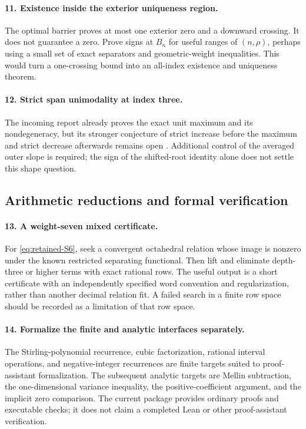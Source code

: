 \paragraph{11. Existence inside the exterior uniqueness region.}
The optimal barrier proves at most one exterior zero and a downward
crossing. It does not guarantee a zero. Prove signs at $B_n$ for useful
ranges of $(n,\rho)$, perhaps using a small set of exact separators
and geometric-weight inequalities. This would turn a one-crossing
bound into an all-index existence and uniqueness theorem.

\paragraph{12. Strict span unimodality at index three.}
The incoming report already proves the exact unit maximum and its
nondegeneracy, but its stronger conjecture of strict increase before
the maximum and strict decrease afterwards remains open
\cite{IncomingPhase}. Additional control of the averaged outer slope
is required; the sign of the shifted-root identity alone does not
settle this shape question.

\subsection{Arithmetic reductions and formal verification}

\paragraph{13. A weight-seven mixed certificate.}
For \eqref{eq:retained-S6}, seek a convergent octahedral relation whose
image is nonzero under the known restricted separating functional.
Then lift and eliminate depth-three or higher terms with exact rational
rows. The useful output is a short certificate with an independently
specified word convention and regularization, rather than another
decimal relation fit. A failed search in a finite row space should be
recorded as a limitation of that row space.

\paragraph{14. Formalize the finite and analytic interfaces separately.}
The Stirling-polynomial recurrence, cubic factorization, rational
interval operations, and negative-integer recurrences are finite
targets suited to proof-assistant formalization. The subsequent
analytic targets are Mellin subtraction, the one-dimensional variance
inequality, the positive-coefficient argument, and the implicit
zero comparison. The current package provides ordinary proofs and
executable checks; it does not claim a completed Lean or other
proof-assistant verification.
